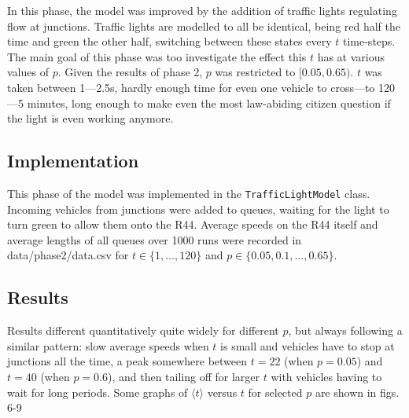 \documentclass{article}
\begin{document}
In this phase, the model was improved by the addition of traffic lights regulating flow at junctions. Traffic lights are modelled to all be identical, being red half the time and green the other half, switching between these states every $t$ time-steps. The main goal of this phase was too investigate the effect this $t$ has at various values of $p$. Given the results of phase 2, $p$ was restricted to $[0.05, 0.65)$. $t$ was taken between 1---2.5s, hardly enough time for even one vehicle to cross---to 120---5 minutes, long enough to make even the most law-abiding citizen question if the light is even working anymore.

\subsection*{Implementation}

This phase of the model was implemented in the \texttt{TrafficLightModel} class. Incoming vehicles from junctions were added to queues, waiting for the light to turn green to allow them onto the R44. Average speeds on the R44 itself and average lengths of all queues over 1000 runs were recorded in data/phase2/data.csv for $t \in \{1, \dots , 120\}$ and $p \in \{0.05, 0.1, \dots , 0.65\}$.

\subsection*{Results}

Results different quantitatively quite widely for different $p$, but always following a similar pattern: slow average speeds when $t$ is small and vehicles have to stop at junctions all the time, a peak somewhere between $t=22$ (when $p=0.05$) and $t=40$ (when $p=0.6$), and then tailing off for larger $t$ with vehicles having to wait for long periods. Some graphs of $\langle t \rangle$ versus $t$ for selected $p$ are shown in figs. 6-9 %
\end{document}
